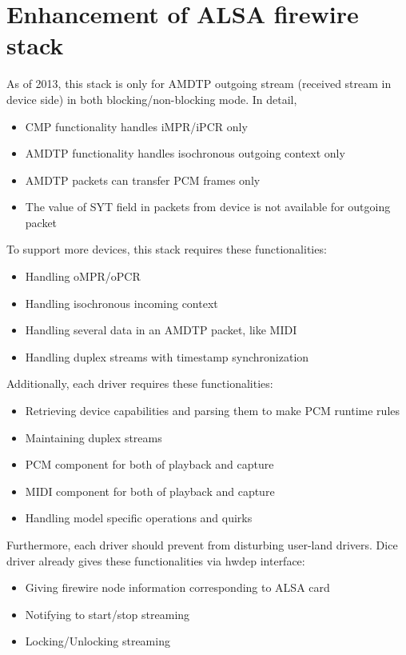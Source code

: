 \documentclass[onecolumn]{jarticle}
\begin{document}
\section{Enhancement of ALSA firewire stack}

As of 2013, this stack is only for AMDTP outgoing stream (received stream in device side) in both blocking/non-blocking mode. In detail,
\begin{itemize}
\item CMP functionality handles iMPR/iPCR only
\item AMDTP functionality handles isochronous outgoing context only
\item AMDTP packets can transfer PCM frames only
\item The value of SYT field in packets from device is not available for outgoing packet
\end{itemize}

To support more devices, this stack requires these functionalities:
\begin{itemize}
\item Handling oMPR/oPCR
\item Handling isochronous incoming context
\item Handling several data in an AMDTP packet, like MIDI
\item Handling duplex streams with timestamp synchronization
\end{itemize}

Additionally, each driver requires these functionalities:
\begin{itemize}
\item Retrieving device capabilities and parsing them to make PCM runtime rules
\item Maintaining duplex streams
\item PCM component for both of playback and capture
\item MIDI component for both of playback and capture
\item Handling model specific operations and quirks
\end{itemize}

Furthermore, each driver should prevent from disturbing user-land drivers. Dice driver already gives these functionalities via hwdep interface:
\begin{itemize}
\item Giving firewire node information corresponding to ALSA card
\item Notifying to start/stop streaming
\item Locking/Unlocking streaming
\end{itemize}
\end{document}
